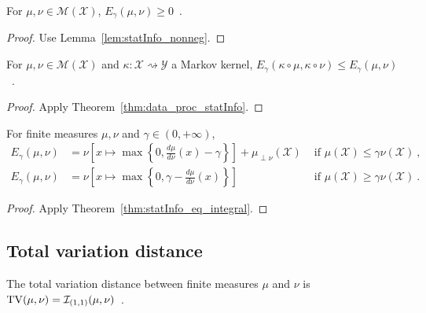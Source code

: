 \begin{lemma}
  \label{lem:eGamma_nonneg}
  For $\mu, \nu \in \mathcal M(\mathcal X)$, $E_\gamma(\mu, \nu) \ge 0$~.
\end{lemma}

\begin{proof}%
{}
Use Lemma~\ref{lem:statInfo_nonneg}.
\end{proof}

\begin{theorem}
  \label{thm:data_proc_eGamma}
  \leanok
  For $\mu, \nu \in \mathcal M(\mathcal X)$ and $\kappa : \mathcal X \rightsquigarrow \mathcal Y$ a Markov kernel, $E_\gamma(\kappa \circ \mu, \kappa \circ \nu) \le E_\gamma(\mu, \nu)$~.
\end{theorem}

\begin{proof}\leanok
{}
Apply Theorem~\ref{thm:data_proc_statInfo}.
\end{proof}

\begin{lemma}
  \label{lem:eGamma_eq_integral}
  For finite measures $\mu, \nu$ and $\gamma \in (0,+\infty)$,
  \begin{align*}
  E_\gamma(\mu, \nu)
  &= \nu\left[ x \mapsto \max \left\{0 , \frac{d \mu}{d\nu}(x) - \gamma \right\} \right] + \mu_{\perp \nu}(\mathcal X) & \text{ if } \mu(\mathcal X) \le \gamma \nu(\mathcal X)
  \: , \\
  E_\gamma(\mu, \nu)
  &= \nu\left[ x \mapsto \max \left\{0 , \gamma - \frac{d \mu}{d\nu}(x) \right\} \right] & \text{ if } \mu(\mathcal X) \ge \gamma \nu(\mathcal X)
  \: .
  \end{align*}
\end{lemma}

\begin{proof}%
{}
Apply Theorem~\ref{thm:statInfo_eq_integral}.
\end{proof}



\subsection{Total variation distance}

\begin{definition}
  \label{def:TV}
  The total variation distance between finite measures $\mu$ and $\nu$ is $\operatorname{TV}(\mu, \nu) = \mathcal I_{(1,1)}(\mu, \nu)$~.
\end{definition}


